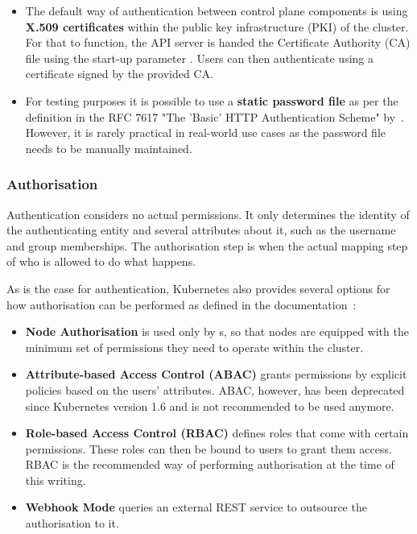 \begin{itemize}
    \item The default way of authentication between control plane components is using \textbf{X.509 certificates} within the public key infrastructure (PKI) of the cluster. For that to function, the API server is handed the Certificate Authority (CA) file using the start-up parameter . Users can then authenticate using a certificate signed by the provided CA. 

    
    
    \item For testing purposes it is possible to use a \textbf{static password file} as per the definition in the RFC 7617 "The 'Basic' HTTP Authentication Scheme" by~\textcite{RFC7617}. However, it is rarely practical in real-world use cases as the password file needs to be manually maintained.
	
\end{itemize}

\subsubsection{Authorisation} \label{authorisation}

Authentication considers no actual permissions. It only determines the identity of the authenticating entity and several attributes about it, such as the username and group memberships. The authorisation step is when the actual mapping step of who is allowed to do what happens. 

As is the case for authentication, Kubernetes also provides several options for how authorisation can be performed as defined in the documentation~\textcite{k8sdocs}:

\begin{itemize}
    \item \textbf{Node Authorisation} is used only by s, so that nodes are equipped with the minimum set of permissions they need to operate within the cluster.
    \item \textbf{Attribute-based Access Control (ABAC)} grants permissions by explicit policies based on the users' attributes. ABAC, however, has been deprecated since Kubernetes version 1.6 and is not recommended to be used anymore.
    \item \textbf{Role-based Access Control (RBAC)} defines roles that come with certain permissions. These roles can then be bound to users to grant them access. RBAC is the recommended way of performing authorisation at the time of this writing.
    \item \textbf{Webhook Mode} queries an external REST service to outsource the authorisation to it.
\end{itemize}

